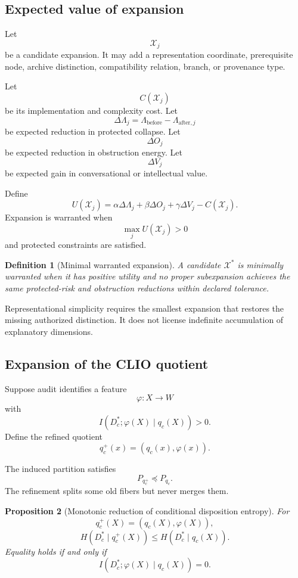 \documentclass[11pt]{article}
\newtheorem{definition}{Definition}[section]
\newtheorem{proposition}[definition]{Proposition}
\theoremstyle{definition}
\begin{document}
\subsection{Expected value of expansion}

Let
\[
\mathcal X_j
\]
be a candidate expansion. It may add a representation coordinate, prerequisite node, archive distinction, compatibility relation, branch, or provenance type.

Let
\[
C(\mathcal X_j)
\]
be its implementation and complexity cost. Let
\[
\Delta\Lambda_j
=
\Lambda_{\mathrm{before}}
-
\Lambda_{\mathrm{after},j}
\]
be expected reduction in protected collapse. Let
\[
\Delta O_j
\]
be expected reduction in obstruction energy. Let
\[
\Delta V_j
\]
be expected gain in conversational or intellectual value.

Define
\[
U(\mathcal X_j)
=
\alpha\Delta\Lambda_j
+
\beta\Delta O_j
+
\gamma\Delta V_j
-
C(\mathcal X_j).
\]
Expansion is warranted when
\[
\max_jU(\mathcal X_j)>0
\]
and protected constraints are satisfied.

\begin{definition}[Minimal warranted expansion]
A candidate \(\mathcal X^{*}\) is minimally warranted when it has positive utility and no proper subexpansion achieves the same protected-risk and obstruction reductions within declared tolerance.
\end{definition}

Representational simplicity requires the smallest expansion that restores the missing authorized distinction. It does not license indefinite accumulation of explanatory dimensions.

\subsection{Expansion of the CLIO quotient}

Suppose audit identifies a feature
\[
\varphi:X\to W
\]
with
\[
I(D_c^{*};\varphi(X)\mid q_c(X))>0.
\]
Define the refined quotient
\[
q_c^{+}(x)
=
(q_c(x),\varphi(x)).
\]

The induced partition satisfies
\[
P_{q_c^{+}}
\preceq
P_{q_c}.
\]
The refinement splits some old fibers but never merges them.

\begin{proposition}[Monotonic reduction of conditional disposition entropy]
For
\[
q_c^{+}(X)
=
(q_c(X),\varphi(X)),
\]
\[
H(D_c^{*}\mid q_c^{+}(X))
\leq
H(D_c^{*}\mid q_c(X)).
\]
Equality holds if and only if
\[
I(D_c^{*};\varphi(X)\mid q_c(X))=0.
\]
\end{proposition}
\end{document}
